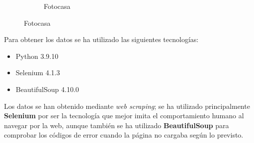 \documentclass[12pt]{article}
\begin{document}
\begin{figure}[h]
\begin{subfigure}{0.5\textwidth}
		\caption{\vspace{1.5em}Fotocasa}
	\end{subfigure}
	\vspace{-2.5em}
\end{figure}

Para obtener los datos se ha utilizado las siguientes tecnologías:

\begin{multicols}{3}
	\begin{itemize}[topsep=0cm,partopsep=0cm,wide]
		\item Python 3.9.10
		\item Selenium 4.1.3
		\item BeautifulSoup 4.10.0
	\end{itemize}
\end{multicols}\vspace{-10pt}

Los datos se han obtenido mediante \textit{web scraping}; se ha utilizado principalmente \textbf{Selenium} por ser la tecnología que mejor imita el comportamiento humano al navegar por la web, aunque también se ha utilizado \textbf{BeautifulSoup} para comprobar los códigos de error cuando la página no cargaba según lo previsto.
\end{document}
